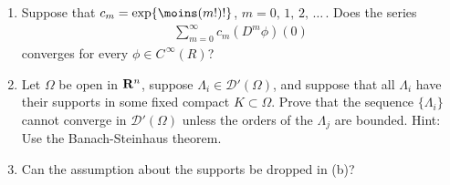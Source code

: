 \renewcommand{\labelenumi}{(\alph{enumi})} 
{\CMUCS
\begin{enumerate}
\item Suppose that $c_m=\exp\{\moins (m!)!\}$, $m=0,\, 1,\, 2,\, \dots\, $. Does the series
\begin{align*}{
\sum_{m=0}^\infty c_m (D^m\phi)(0)
}\end{align*}
converges for every $\phi\in C^{\,\infty} (R)$?
\item Let $\Omega$ be open in ${\mathbf R}^n$, suppose $\Lambda_i\in \mathscr{D}'(\Omega)$, and suppose that all $\Lambda_i$ have their supports in some fixed compact $K\subset \Omega$. Prove that the sequence $\{\Lambda_i\}$ cannot converge in $\mathscr{D}'(\Omega)$ unless the orders of the $\Lambda_j$ are bounded. Hint: Use the Banach-Steinhaus theorem.
\item Can the assumption about the supports be dropped in (b)?
\end{enumerate}}

